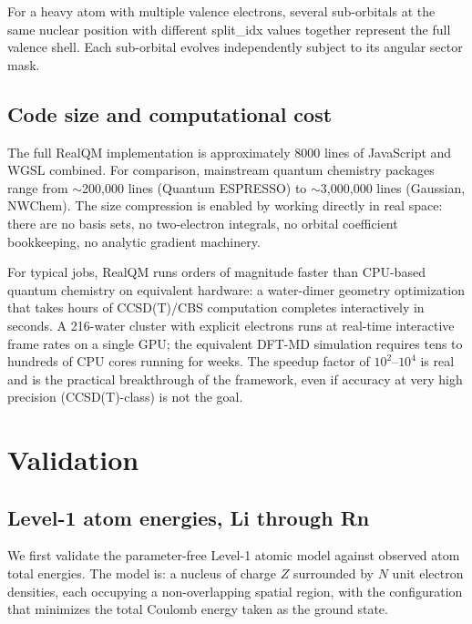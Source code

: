 \documentclass[11pt]{article}
\begin{document}
For a heavy atom with multiple valence electrons, several sub-orbitals at the same nuclear position with different split\_idx values together represent the full valence shell. Each sub-orbital evolves independently subject to its angular sector mask.

\subsection{Code size and computational cost}

The full RealQM implementation is approximately 8000 lines of JavaScript and WGSL combined. For comparison, mainstream quantum chemistry packages range from $\sim$200,000 lines (Quantum ESPRESSO) to $\sim$3,000,000 lines (Gaussian, NWChem). The size compression is enabled by working directly in real space: there are no basis sets, no two-electron integrals, no orbital coefficient bookkeeping, no analytic gradient machinery.

For typical jobs, RealQM runs orders of magnitude faster than CPU-based quantum chemistry on equivalent hardware: a water-dimer geometry optimization that takes hours of CCSD(T)/CBS computation completes interactively in seconds. A 216-water cluster with explicit electrons runs at real-time interactive frame rates on a single GPU; the equivalent DFT-MD simulation requires tens to hundreds of CPU cores running for weeks. The speedup factor of $10^2$--$10^4$ is real and is the practical breakthrough of the framework, even if accuracy at very high precision (CCSD(T)-class) is not the goal.

\section{Validation}\label{sec:validation}

\subsection{Level-1 atom energies, Li through Rn}\label{sec:atoms}

We first validate the parameter-free Level-1 atomic model against observed atom total energies. The model is: a nucleus of charge $Z$ surrounded by $N$ unit electron densities, each occupying a non-overlapping spatial region, with the configuration that minimizes the total Coulomb energy taken as the ground state.
\end{document}
